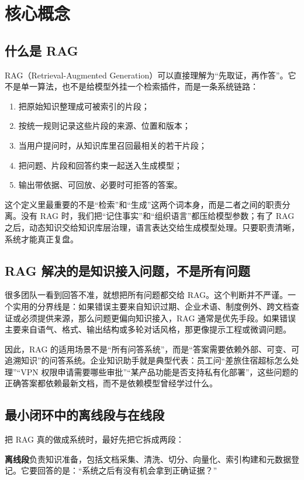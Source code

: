 \section{核心概念}
\subsection{什么是 RAG}
RAG（Retrieval-Augmented Generation）可以直接理解为“先取证，再作答”。它不是单一算法，也不是给模型外挂一个检索插件，而是一条系统链路：
\begin{enumerate}
  \item 把原始知识整理成可被索引的片段；
  \item 按统一规则记录这些片段的来源、位置和版本；
  \item 当用户提问时，从知识库里召回最相关的若干片段；
  \item 把问题、片段和回答约束一起送入生成模型；
  \item 输出带依据、可回放、必要时可拒答的答案。
\end{enumerate}

这个定义里最重要的不是“检索”和“生成”这两个词本身，而是二者之间的职责分离。没有 RAG 时，我们把“记住事实”和“组织语言”都压给模型参数；有了 RAG 之后，动态知识交给知识库层治理，语言表达交给生成模型处理。只要职责清晰，系统才能真正复盘。

\subsection{RAG 解决的是知识接入问题，不是所有问题}
很多团队一看到回答不准，就想把所有问题都交给 RAG。这个判断并不严谨。一个实用的分界线是：如果错误主要来自知识过期、企业术语、制度例外、跨文档查证或必须提供来源，那么问题更偏向知识接入，RAG 通常是优先手段。如果错误主要来自语气、格式、输出结构或多轮对话风格，那更像提示工程或微调问题。

因此，RAG 的适用场景不是“所有问答系统”，而是“答案需要依赖外部、可变、可追溯知识”的问答系统。企业知识助手就是典型代表：员工问“差旅住宿超标怎么处理”“VPN 权限申请需要哪些审批”“某产品功能是否支持私有化部署”，这些问题的正确答案都依赖最新文档，而不是依赖模型曾经学过什么。

\subsection{最小闭环中的离线段与在线段}
把 RAG 真的做成系统时，最好先把它拆成两段：

\textbf{离线段}负责知识准备，包括文档采集、清洗、切分、向量化、索引构建和元数据登记。它要回答的是：“系统之后有没有机会拿到正确证据？”

